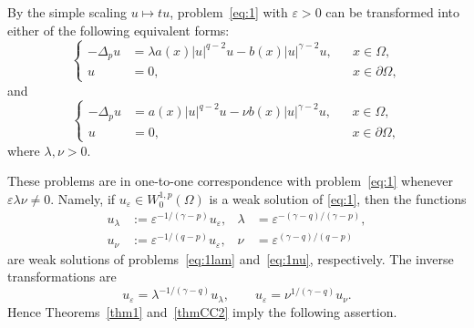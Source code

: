 \documentclass[preprint,11pt]{elsarticle}
\numberwithin{equation}{section}
\begin{document}
By the simple scaling \(u\mapsto tu\), problem~\eqref{eq:1} with
\(\varepsilon>0\) can be transformed into either of the following equivalent
forms:
\begin{equation}\label{eq:1lam}
	\left\{
	\begin{aligned}
		-\Delta_p u
		&=
		\lambda a(x)|u|^{q-2}u
		-
		b(x)|u|^{\gamma-2}u,
		&& x\in\Omega,\\
		u&=0,
		&& x\in\partial\Omega,
	\end{aligned}
	\right.
\end{equation}
and
\begin{equation}\label{eq:1nu}
	\left\{
	\begin{aligned}
		-\Delta_p u
		&=
		a(x)|u|^{q-2}u
		-
		\nu b(x)|u|^{\gamma-2}u,
		&& x\in\Omega,\\
		u&=0,
		&& x\in\partial\Omega,
	\end{aligned}
	\right.
\end{equation}
where \(\lambda,\nu>0\).

These problems are in one-to-one correspondence with problem~\eqref{eq:1}
whenever \(\varepsilon\lambda\nu\neq0\). Namely, if
\(u_\varepsilon\in W^{1,p}_0(\Omega)\) is a weak solution of
\eqref{eq:1}, then the functions
\begin{align}
	u_\lambda
	&:=
	\varepsilon^{-1/(\gamma-p)}u_\varepsilon,
	&
	\lambda
	&=
	\varepsilon^{-(\gamma-q)/(\gamma-p)},
	\label{eq:scaling-lambda}
	\\
	u_\nu
	&:=
	\varepsilon^{-1/(q-p)}u_\varepsilon,
	&
	\nu
	&=
	\varepsilon^{(\gamma-q)/(q-p)}
	\label{eq:scaling-nu}
\end{align}
are weak solutions of problems~\eqref{eq:1lam} and~\eqref{eq:1nu},
respectively. The inverse transformations are
\[
u_\varepsilon
=
\lambda^{-1/(\gamma-q)}u_\lambda,
\qquad
u_\varepsilon
=
\nu^{1/(\gamma-q)}u_\nu .
\]
Hence Theorems~\ref{thm1} and~\ref{thmCC2} imply the following assertion.
\end{document}
